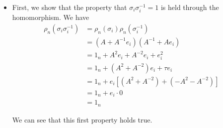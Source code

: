 \documentclass[12pt]{article}
\begin{document}
\begin{itemize} 
\item First, we show that the property that $\sigma_i \sigma_{i}^{-1} = 1$ is held through the homomorphism. We have
\begin{align*}
   \rho_n (\sigma_i \sigma_i^{-1}) &= \rho_n(\sigma_i) \rho_n(\sigma_i^{-1}) \\
   &= (A + A^{-1} e_i) (A^{-1} + A e_i) \\
   &= 1_n + A^2 e_i + A^{-2} e_i + e_i^2 \\
   &= 1_n + (A^2 + A^{-2}) e_i + \tau e_i \\
   &= 1_n + e_i [(A^2 + A^{-2}) + (-A^2 - A^{-2})] \\
   &= 1_n + e_i \cdot 0 \\
   &= 1_n
   \end{align*}
   
We can see that this first property holds true. 


\end{itemize}
\end{document}
